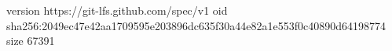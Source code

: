 version https://git-lfs.github.com/spec/v1
oid sha256:2049ec47e42aa1709595e203896dc635f30a44e82a1e553f0c40890d64198774
size 67391
